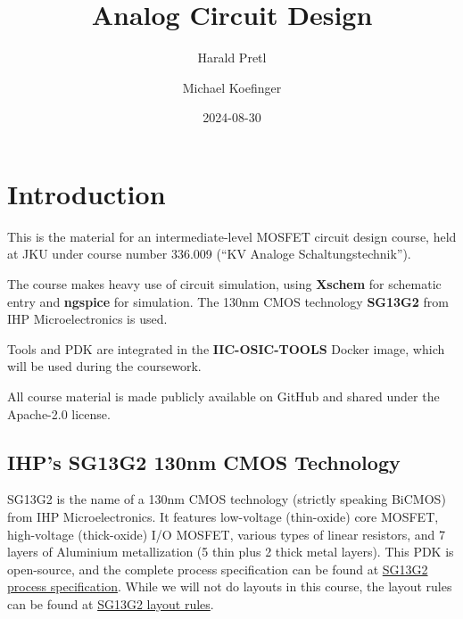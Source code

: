 \documentclass[
  a4paper,
  DIV=11,
  numbers=noendperiod]{scrartcl}
\title{Analog Circuit Design}
\author{Harald Pretl \and Michael Koefinger}
\date{2024-08-30}
\renewcommand*\contentsname{Table of contents}
\newcommand\contentsname{Table of contents}
\begin{document}
\maketitle

\renewcommand*\contentsname{Table of contents}
{
\hypersetup{linkcolor=}
\setcounter{tocdepth}{3}
\tableofcontents
}

\section{Introduction}\label{sec-intro}

This is the material for an intermediate-level MOSFET circuit design
course, held at JKU under course number 336.009 (``KV Analoge
Schaltungstechnik'').

The course makes heavy use of circuit simulation, using \textbf{Xschem}
for schematic entry and \textbf{ngspice} for simulation. The 130nm CMOS
technology \textbf{SG13G2} from IHP Microelectronics is used.

Tools and PDK are integrated in the \textbf{IIC-OSIC-TOOLS} Docker
image, which will be used during the coursework.

\begin{tcolorbox}[enhanced jigsaw, breakable, title=\textcolor{quarto-callout-important-color}{\faExclamation}\hspace{0.5em}{Important}, left=2mm, bottomrule=.15mm, opacitybacktitle=0.6, opacityback=0, colframe=quarto-callout-important-color-frame, leftrule=.75mm, bottomtitle=1mm, colbacktitle=quarto-callout-important-color!10!white, toprule=.15mm, rightrule=.15mm, toptitle=1mm, titlerule=0mm, arc=.35mm, colback=white, coltitle=black]

All course material is made publicly available on GitHub and shared
under the Apache-2.0 license.

\end{tcolorbox}

\subsection{IHP's SG13G2 130nm CMOS
Technology}\label{ihps-sg13g2-130nm-cmos-technology}

SG13G2 is the name of a 130nm CMOS technology (strictly speaking BiCMOS)
from IHP Microelectronics. It features low-voltage (thin-oxide) core
MOSFET, high-voltage (thick-oxide) I/O MOSFET, various types of linear
resistors, and 7 layers of Aluminium metallization (5 thin plus 2 thick
metal layers). This PDK is open-source, and the complete process
specification can be found at
\href{https://github.com/IHP-GmbH/IHP-Open-PDK/blob/main/ihp-sg13g2/libs.doc/doc/SG13G2_os_process_spec.pdf}{SG13G2
process specification}. While we will not do layouts in this course, the
layout rules can be found at
\href{https://github.com/IHP-GmbH/IHP-Open-PDK/blob/main/ihp-sg13g2/libs.doc/doc/SG13G2_os_layout_rules.pdf}{SG13G2
layout rules}.
\end{document}
